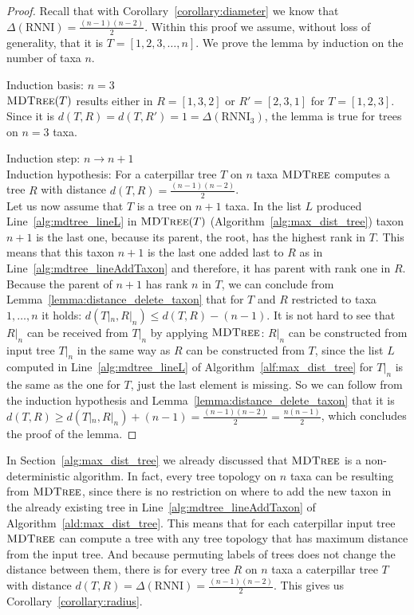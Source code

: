 \documentclass{amsart}
\newcommand{\rnni}{\mathrm{RNNI}}
\newcommand{\mdtree}{\textsc{MDTree}}
\begin{document}
\begin{proof}
    Recall that with Corollary~\ref{corollary:diameter} we know that $\Delta(\rnni) = \frac{(n-1)(n-2)}{2}$.
    Within this proof we assume, without loss of generality, that it is $T = [1,2,3,\ldots,n]$.
    We prove the lemma by induction on the number of taxa $n$.

    Induction basis: $n = 3$\\
    $\mdtree(T)$ results either in $R =[1,3,2]$ or $R'= [2,3,1]$ for $T = [1,2,3]$.
    Since it is $d(T,R) = d(T,R') = 1 = \Delta(\rnni_3)$, the lemma is true for trees on $n=3$ taxa.

    Induction step: $n \to n+1$\\
    Induction hypothesis: For a caterpillar tree $T$ on $n$ taxa $\mdtree$ computes a tree $R$ with distance $d(T,R) = \frac{(n-1)(n-2)}{2}$.\\
    Let us now  assume that $T$ is a tree on $n+1$ taxa.
    In the list $L$ produced Line~\ref{alg:mdtree_lineL} in $\mdtree(T)$ (Algorithm~\ref{alg:max_dist_tree}) taxon $n+1$ is the last one, because its parent, the root, has the highest rank in $T$.
    This means that this taxon $n+1$ is the last one added last to $R$ as in Line~\ref{alg:mdtree_lineAddTaxon} and therefore, it has parent with rank one in $R$.
    Because the parent of $n+1$ has rank $n$ in $T$, we can conclude from Lemma~\ref{lemma:distance_delete_taxon} that for $T$ and $R$ restricted to taxa $1,\ldots,n$ it holds: $d(T|_n,R|_n) \leq d(T,R) - (n-1)$.
    It is not hard to see that $R|_n$ can be received from $T|_n$ by applying $\mdtree$:
    $R|_n$ can be constructed from input tree $T|_n$ in the same way as $R$ can be constructed from $T$, since the list $L$ computed in Line~\ref{alg:mdtree_lineL} of Algorithm~\ref{alf:max_dist_tree} for $T|_n$ is the same as the one for $T$, just the last element is missing.
    So we can follow from the induction hypothesis and Lemma~\ref{lemma:distance_delete_taxon} that it is $d(T,R) \geq d(T|_n,R|_n) + (n-1) = \frac{(n-1)(n-2)}{2} = \frac{n(n-1)}{2}$, which concludes the proof of the lemma.
\end{proof}

In Section~\ref{alg:max_dist_tree} we already discussed that $\mdtree$ is a non-deterministic algorithm.
In fact, every tree topology on $n$ taxa can be resulting from $\mdtree$, since there is no restriction on where to add the new taxon in the already existing tree in Line~\ref{alg:mdtree_lineAddTaxon} of Algorithm~\ref{ald:max_dist_tree}.
This means that for each caterpillar input tree $\mdtree$ can compute a tree with any tree topology that has maximum distance from the input tree.
And because permuting labels of trees does not change the distance between them, there is for every tree $R$ on $n$ taxa a caterpillar tree $T$ with distance $d(T,R) = \Delta(\rnni) = \frac{(n-1)(n-2)}{2}$.
This gives us Corollary~\ref{corollary:radius}.
\end{document}
